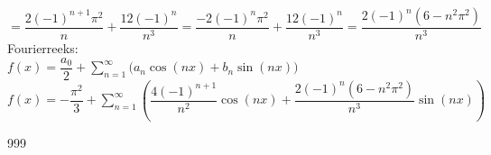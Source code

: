 \documentclass[a4paper]{article}
\begin{document}
$= \dfrac{2(-1)^{n+1}\pi^2}{n}
+ \dfrac{12(-1)^n}{n^3}
= \dfrac{-2(-1)^n\pi^2}{n}
+ \dfrac{12(-1)^n}{n^3}
= \dfrac{2(-1)^n(6 - n^2\pi^2)}{n^3}$\\

Fourierreeks:\\

$f(x) = \dfrac{a_0}{2} + \displaystyle\sum_{n=1}^{\infty}\bigl(a_n\cos(nx)+b_n\sin(nx)\bigr)$\\

$f(x) = -\dfrac{\pi^2}{3}
+ \displaystyle\sum_{n=1}^{\infty}\left(
\dfrac{4(-1)^{n+1}}{n^2}\cos(nx)
+\dfrac{2(-1)^n(6-n^2\pi^2)}{n^3}\sin(nx)
\right)$



\begin{thebibliography}{999}
\end{thebibliography}
\end{document}
